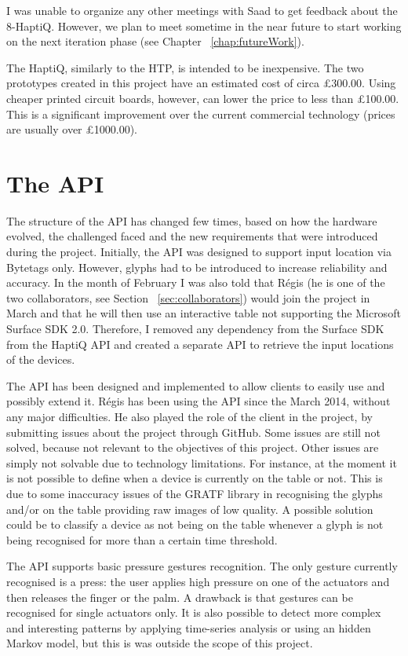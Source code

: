 I was unable to organize any other meetings with Saad to get feedback about the 8-HaptiQ. However, we plan to meet sometime in the near future to start working on the next iteration phase (see Chapter ~\ref{chap:futureWork}). 

The HaptiQ, similarly to the HTP, is intended to be inexpensive. The two prototypes created in this project have an estimated cost of circa £300.00. Using cheaper printed circuit boards, however, can lower the price to less than £100.00. This is a significant improvement over the current commercial technology (prices are usually over £1000.00).

\section{The API}

The structure of the API has changed few times, based on how the hardware evolved, the challenged faced and the new requirements that were introduced during the project. 
Initially, the API was designed to support input location via Bytetags only. However, glyphs had to be introduced to increase reliability and accuracy. In the month of February I was also told that Régis (he is one of the two collaborators, see Section ~\ref{sec:collaborators}) would join the project in March and that he will then use an interactive table not supporting the Microsoft Surface SDK 2.0. Therefore, I removed any dependency from the Surface SDK from the HaptiQ API and created a separate API to retrieve the input locations of the devices. 

The API has been designed and implemented to allow clients to easily use and possibly extend it. Régis has been using the API since the  March 2014, without any major difficulties. He also played the role of the client in the project, by submitting issues about the project through GitHub. Some issues are still not solved, because not relevant to the objectives of this project. Other issues are simply not solvable due to technology limitations. For instance, at the moment it is not possible to define when a device is currently on the table or not. This is due to some inaccuracy issues of the GRATF library in recognising the glyphs and/or on the table providing raw images of low quality. A possible solution could be to classify a device as not being on the table whenever a glyph is not being recognised for more than a certain time threshold. 

The API supports basic pressure gestures recognition. The only gesture currently recognised is a press: the user applies high pressure on one of the actuators and then releases the finger or the palm. A drawback is that gestures can be recognised for single actuators only. It is also possible to detect more complex and interesting patterns by applying time-series analysis or using an hidden Markov model, but this is was outside the scope of this project. 

